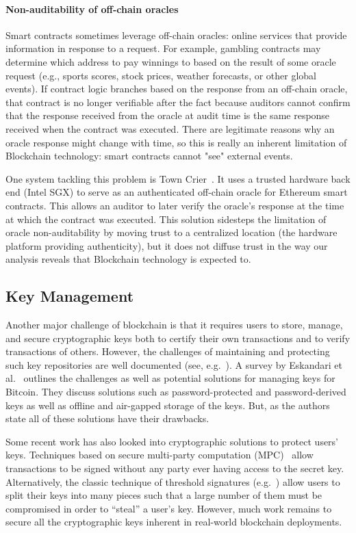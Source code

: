 \paragraph{Non-auditability of off-chain oracles}
Smart contracts sometimes leverage off-chain oracles: online services that provide information in response to a request. For example, gambling contracts may determine which address to pay winnings to based on the result of some oracle request (e.g., sports scores, stock prices, weather forecasts, or other global events). If contract logic branches based on the response from an off-chain oracle, that contract is no longer verifiable after the fact because auditors cannot confirm that the response received from the oracle at audit time is the same response received when the contract was executed. There are legitimate reasons why an oracle response might change with time, so this is really an inherent limitation of Blockchain technology: smart contracts cannot "see" external events.

One system tackling this problem is Town Crier~\cite{Zhang16}. It uses a trusted hardware back end (Intel SGX) to serve as an authenticated off-chain oracle for Ethereum smart contracts. This allows an auditor to later verify the oracle's response at the time at which the contract was executed. This solution sidesteps the limitation of oracle non-auditability by moving trust to a centralized location (the hardware platform providing authenticity), but it does not diffuse trust in the way our analysis reveals that Blockchain technology is expected to.

\subsection{Key Management}
Another major challenge of blockchain is that it requires users to store, manage, and secure cryptographic keys both to certify their own transactions and to verify transactions of others.  However, the challenges of maintaining and protecting such key repositories are well documented (see, e.g.~\cite{uss:WhiTyg99}).  A survey by Eskandari et al.~\cite{arxiv:ECBS18} outlines the challenges as well as potential solutions for managing keys for Bitcoin.  They discuss solutions such as password-protected and password-derived keys as well as offline and air-gapped storage of the keys.  But, as the authors state all of these solutions have their drawbacks.

Some recent work has also looked into cryptographic solutions to protect users' keys.  Techniques based on secure multi-party computation (MPC)~\cite{CCS:LinNof18,C:Lindell17} allow transactions to be signed without any party ever having access to the secret key.  Alternatively, the classic technique of threshold signatures (e.g.~\cite{PKC:Boldyreva03,EC:GJKR96,EC:Shoup00a}) allow users to split their keys into many pieces such that a large number of them must be compromised in order to ``steal'' a user's key.  However, much work remains to secure all the cryptographic keys inherent in real-world blockchain deployments.


